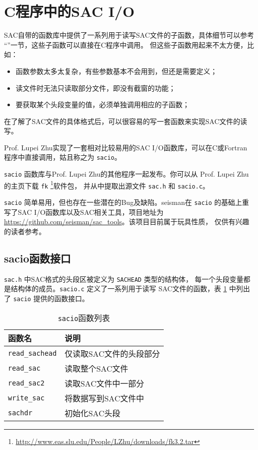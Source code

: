 \section{C程序中的SAC I/O}
SAC自带的函数库中提供了一系列用于读写SAC文件的子函数，具体细节可以参考
``''一节，这些子函数可以直接在C程序中调用。
但这些子函数用起来不太方便，比如：
\begin{itemize}
\item 函数参数太多太复杂，有些参数基本不会用到，但还是需要定义；
\item 读文件时无法只读取部分文件，即没有截窗的功能；
\item 要获取某个头段变量的值，必须单独调用相应的子函数；
\end{itemize}

在了解了SAC文件的具体格式后，可以很容易的写一套函数来实现SAC文件的读写。

Prof. Lupei Zhu实现了一套相对比较易用的SAC I/O函数库，可以在C或Fortran
程序中直接调用，姑且称之为 \texttt{sacio}。

\texttt{sacio} 函数库与Prof. Lupei Zhu的其他程序一起发布。你可以从
Prof. Lupei Zhu的主页下载 \texttt{fk} \footnote{
\url{http://www.eas.slu.edu/People/LZhu/downloads/fk3.2.tar}}软件包，
并从中提取出源文件 \texttt{sac.h} 和 \texttt{sacio.c}。

\texttt{sacio} 简单易用，但也存在一些潜在的Bug及缺陷。seisman在
\texttt{sacio} 的基础上重写了SAC I/O函数库以及SAC相关工具，项目地址为
\url{https://github.com/seisman/sac_tools}。该项目目前属于玩具性质，
仅供有兴趣的读者参考。

\subsection{sacio函数接口}
\texttt{sac.h} 中SAC格式的头段区被定义为 \texttt{SACHEAD} 类型的结构体，
每一个头段变量都是结构体的成员。\texttt{sacio.c} 定义了一系列用于读写
SAC文件的函数，表 \ref{table:sacio-function} 中列出了 \texttt{sacio}
提供的函数接口。

\begin{table}[H]
\centering
\caption{\texttt{sacio}函数列表}
\label{table:sacio-function}
\begin{tabular}{ll}
\toprule
函数名      &   说明        \\
\midrule
\verb|read_sachead|      &   仅读取SAC文件的头段部分 \\
\verb|read_sac|          &   读取整个SAC文件 \\
\verb|read_sac2|         &   读取SAC文件中一部分 \\
\verb|write_sac|         &   将数据写到SAC文件中 \\
\verb|sachdr|            &   初始化SAC头段\\
\bottomrule
\end{tabular}
\end{table}

